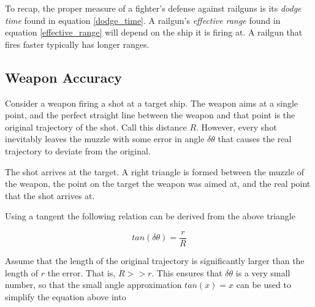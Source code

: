 \documentclass[a4paper]{article}
\begin{document}
To recap, the proper measure of a fighter's defense against railguns is its \textit{dodge time} found in equation \ref{dodge_time}. A railgun's \textit{effective range} found in equation \ref{effective_range} will depend on the ship it is firing at. A railgun that fires faster typically has longer ranges.

\subsection{Weapon Accuracy}

Consider a weapon firing a shot at a target ship. The weapon aims at a single point, and the perfect straight line between the weapon and that point is the original trajectory of the shot. Call this distance $R$. However, every shot inevitably leaves the muzzle with some error in angle $\delta \theta$ that causes the real trajectory to deviate from the original. 

The shot arrives at the target. A right triangle is formed between the muzzle of the weapon, the point on the target the weapon was aimed at, and the real point that the shot arrives at. 

\begin{minipage}[t]{\linewidth} \centering
{}
\end{minipage}

Using a tangent the following relation can be derived from the above triangle

\begin{equation} tan(\delta\theta) = \frac{r}{R} \end{equation}

Assume that the length of the original trajectory is significantly larger than the length of $r$ the error. That is, $ R >> r $. This ensures that $\delta\theta$ is a very small number, so that the small angle approximation $tan(x) = x$ can be used to simplify the equation above into
\end{document}
